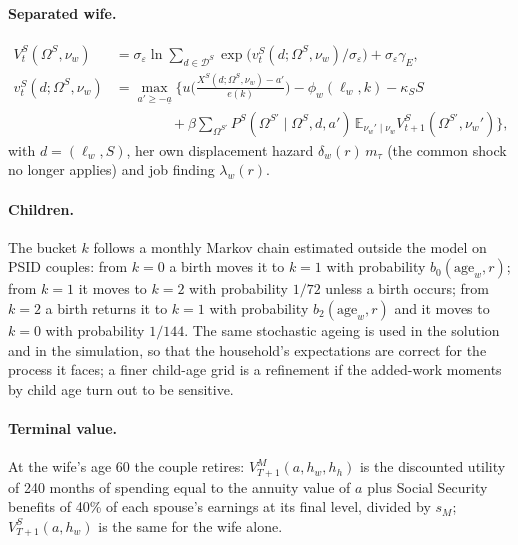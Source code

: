 \documentclass[11pt]{article}
\newcommand{\E}{\mathbb{E}}
\newcommand{\1}{\mathbf{1}}
\begin{document}
\paragraph{Separated wife.}
\begin{align}
  V^S_t(\Omega^S, \nu_w) &= \sigma_\varepsilon \ln \sum_{d \in \mathcal D^S} \exp\!\big(v^S_t(d; \Omega^S, \nu_w)/\sigma_\varepsilon\big) + \sigma_\varepsilon\gamma_E, \label{eq:VS}\\
  v^S_t(d; \Omega^S, \nu_w) &= \max_{a' \ge -\underline a} \Big\{ u\!\Big(\frac{X^S(d; \Omega^S, \nu_w) - a'}{e(k)}\Big)
     - \phi_w(\ell_w, k) - \kappa_S S \nonumber \\
     &\qquad\qquad + \beta \sum_{\Omega^{S\prime}} P^S(\Omega^{S\prime} \mid \Omega^S, d, a')\, \E_{\nu_w' \mid \nu_w} V^S_{t+1}(\Omega^{S\prime}, \nu_w') \Big\}, \nonumber
\end{align}
with $d = (\ell_w, S)$, her own displacement hazard $\delta_w(r)\,m_\tau$ (the common shock no longer applies) and job
finding $\lambda_w(r)$.

\paragraph{Children.} The bucket $k$ follows a monthly Markov chain estimated outside the model on PSID couples: from
$k=0$ a birth moves it to $k=1$ with probability $b_0(\text{age}_w, r)$; from $k=1$ it moves to $k=2$ with probability
$1/72$ unless a birth occurs; from $k=2$ a birth returns it to $k=1$ with probability $b_2(\text{age}_w, r)$ and it
moves to $k=0$ with probability $1/144$. The same stochastic ageing is used in the solution and in the simulation, so
that the household's expectations are correct for the process it faces; a finer child-age grid is a refinement if the
added-work moments by child age turn out to be sensitive.

\paragraph{Terminal value.} At the wife's age 60 the couple retires: $V^M_{T+1}(a, h_w, h_h)$ is the discounted utility
of 240 months of spending equal to the annuity value of $a$ plus Social Security benefits of 40\% of each spouse's
earnings at its final level, divided by $s_M$; $V^S_{T+1}(a, h_w)$ is the same for the wife alone.
\end{document}
